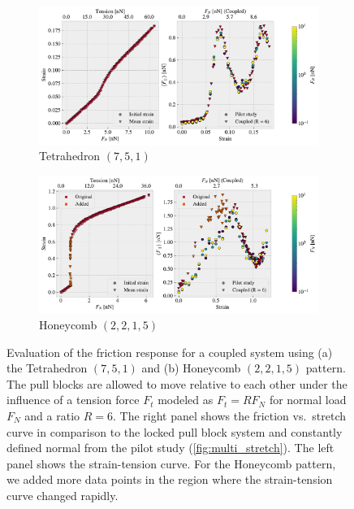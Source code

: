 \begin{figure}[H]
  \centering
  \begin{subfigure}[t]{\textwidth}
      \centering
      \includegraphics[width=\textwidth]{figures/negative_coefficient/manual_coupling_free_pop7_5_1.pdf}
      \caption{Tetrahedron $(7,5,1)$}
  \end{subfigure}
  \hfill
  \begin{subfigure}[t]{\textwidth}
    \centering
    \includegraphics[width=\textwidth]{figures/negative_coefficient/manual_coupling_free_hon2215.pdf}
    \caption{Honeycomb $(2,2,1,5)$}
  \end{subfigure}
  \hfill
  \caption{Evaluation of the friction response for a coupled system using (a) the Tetrahedron $(7,5,1)$ and (b) Honeycomb $(2,2,1,5)$ pattern.  The pull blocks are allowed to move relative to each other under the influence of a tension force $F_t$ modeled as $F_t = RF_N$ for normal load $F_N$ and a ratio $R=6$. The right panel shows the friction vs.\ stretch curve in comparison to the locked pull block system and constantly defined normal from the pilot study (\cref{fig:multi_stretch}). The left panel shows the strain-tension curve. For the Honeycomb pattern, we added more data points in the region where the strain-tension curve changed rapidly.}
  \label{fig:negfric}
\end{figure}

